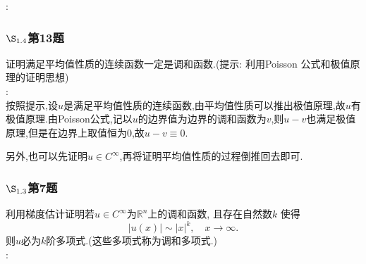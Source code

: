 \documentclass[12pt, a4paper]{article}
\begin{document}
	\songti{}:\\

	\subsubsection{$\S_{1.4}$第13题}
	\kaishu{}证明满足平均值性质的连续函数一定是调和函数.(提示: 利用Poisson 公式和极值原理的证明思想)\\
	
	\songti{}:\\
	
	按照提示,设$u$是满足平均值性质的连续函数,由平均值性质可以推出极值原理,故$u$有极值原理.由Poisson公式,记以$u$的边界值为边界的调和函数为$v$,则$u-v$也满足极值原理,但是在边界上取值恒为0,故$u-v\equiv 0$.
	
	另外,也可以先证明$u\in C^{\infty}$,再将证明平均值性质的过程倒推回去即可.

	\subsubsection{$\S_{1.3}$第7题}
	\kaishu{}利用梯度估计证明若$u \in C^{\infty}$为$\mathbb{R}^n$上的调和函数, 且存在自然数$k$ 使得$$
	|u(x)| \sim |x|^k,\quad x \to \infty.$$
	则$u $必为$k $阶多项式.(这些多项式称为调和多项式.)\\
	
	\songti{}:\\
\end{document}
